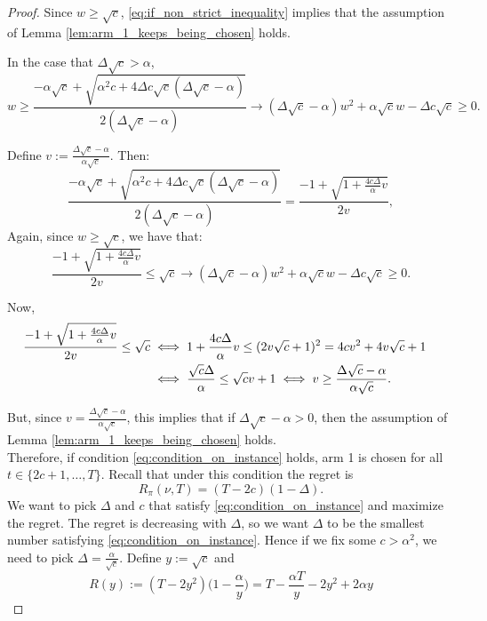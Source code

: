 \documentclass[opre,nonblindrev]{informs3} %
\begin{document}
\begin{proof}
    Since $w\geq \sqrt{c}$, \ref{eq:if_non_strict_inequality} implies that the assumption of Lemma \ref{lem:arm_1_keeps_being_chosen} holds.

    In the case that $\Delta \sqrt{c} > \alpha$, 
    \begin{equation}
        w \geq \frac{-\alpha \sqrt{c}+\sqrt{\alpha^2c+4\Delta c \sqrt{c}( \Delta \sqrt{c}-\alpha)}}{2( \Delta \sqrt{c}-\alpha)} \rightarrow (\Delta \sqrt{c}-\alpha)w^2+\alpha\sqrt{c} w-\Delta c \sqrt{c} \geq 0. 
    \end{equation}

    Define $v:=\frac{\Delta \sqrt{c}-\alpha}{\alpha\sqrt{c}}$. Then:
    $$\frac{-\alpha \sqrt{c}+\sqrt{\alpha^2c+4\Delta c \sqrt{c}( \Delta \sqrt{c}-\alpha)}}{2( \Delta \sqrt{c}-\alpha)} = 
    \frac{-1+\sqrt{1+\frac{4c\Delta}{\alpha}v}}{2v},$$
    Again, since $w\geq \sqrt{c}$, we have that:
    \begin{equation}
        \frac{-1+\sqrt{1+\frac{4c\Delta}{\alpha}v}}{2v}\leq \sqrt{c} \rightarrow (\Delta \sqrt{c}-\alpha)w^2+\alpha\sqrt{c} w-\Delta c \sqrt{c} \geq 0.
    \end{equation}

    Now,
    \begin{align}
        \frac{-1+\sqrt{1+\frac{4c\Delta}{\alpha}v}}{2v}\leq \sqrt{c} &\iff 1+\frac{4c\Delta}{\alpha}v\leq(2v\sqrt{c}+1)^2=4cv^2+4v\sqrt{c}+1\cr
        &\iff \frac{\sqrt{c}\Delta}{\alpha}\leq \sqrt{c}v+1\iff v \geq \frac{\Delta\sqrt{c}-\alpha}{\alpha \sqrt{c}}.
    \end{align}

    But, since $v=\frac{\Delta \sqrt{c}-\alpha}{\alpha\sqrt{c}}$, this implies that if $\Delta \sqrt{c}-\alpha>0$, then the assumption of Lemma \ref{lem:arm_1_keeps_being_chosen} holds.\\
    Therefore, if condition \ref{eq:condition_on_instance} holds, arm 1 is chosen for all $t\in\{2c+1,\ldots,T\}$.
    Recall that under this condition the regret is $$R_{\pi}(\nu, T)=(T-2c)(1-\Delta).$$
    We want to pick $\Delta$ and $c$ that satisfy \ref{eq:condition_on_instance} and maximize the regret. The regret is decreasing with $\Delta$, so we want $\Delta$ to be the smallest number satisfying \ref{eq:condition_on_instance}. Hence if we fix some $c > \alpha^2$, we need to pick $\Delta = \frac{\alpha}{\sqrt{c}}$.
    Define $y:=\sqrt{c}$ and 
    \begin{equation}
        R(y):=(T-2y^2)\bigg(1-\frac{\alpha}{y}\bigg)=T-\frac{\alpha T}{y}-2y^2+2\alpha y
    \end{equation}


\end{proof}
\end{document}
